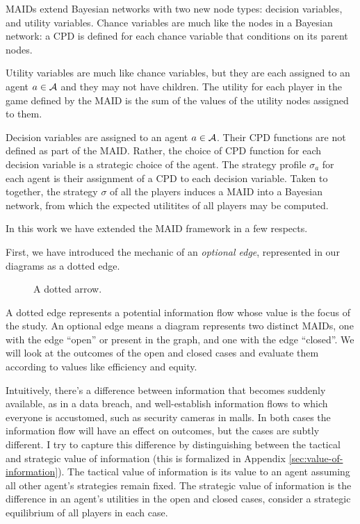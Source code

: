 \documentclass[../thesis.tex]{subfiles}
\begin{document}
MAIDs extend Bayesian networks with two new node types:
decision variables, and utility variables.
Chance variables are much like the nodes in a Bayesian
network: a CPD is defined for each chance variable
that conditions on its parent nodes.

Utility variables are much like chance variables,
but they are each assigned to an agent $a \in \mathcal{A}$
and they may not have children.
The utility for each player in the game defined by
the MAID is the sum of the values of the utility
nodes assigned to them.

Decision variables are assigned to an agent $a \in \mathcal{A}$.
Their CPD functions are not defined as part of the MAID.
Rather, the choice of CPD function for each decision variable
is a strategic choice of the agent. The strategy profile $\sigma_a$
for each agent is their assignment of a CPD to each decision variable.
Taken to together, the strategy $\sigma$ of all the players
induces a MAID into a Bayesian network, from which the
expected utilitites of all players may be computed.

In this work we have extended the MAID framework in a few
respects.

First, we have introduced the mechanic of an \emph{optional edge},
represented in our diagrams as a dotted edge.

\begin{figure}
\begin{center}
\caption{A dotted arrow.}
\end{center}
\end{figure}

A dotted edge represents a potential information flow
whose value is the focus of the study.
An optional edge means a diagram represents two
distinct MAIDs, one with the edge ``open'' or present
in the graph, and one with the edge ``closed''.
We will look at the outcomes of the open and closed
cases and evaluate them
according to values like efficiency and equity.

Intuitively, there's a difference between information that
becomes suddenly available, as in a data breach, and
well-establish information flows to which everyone is
accustomed, such as security cameras in malls.
In both cases the information flow will have an effect on
outcomes, but the cases are subtly different.
I try to capture this difference by distinguishing between the
tactical and strategic
value of information (this is formalized in Appendix
\ref{sec:value-of-information}).
The tactical value of information is its value to an agent
assuming all other agent's strategies remain fixed.
The strategic value of information is the difference
in an agent's utilities in the open and closed cases,
consider a strategic equilibrium of all players in each case.
\end{document}
